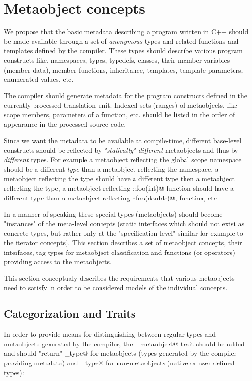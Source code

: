 \section{Metaobject concepts}

We propose that the basic metadata describing a program written
in C++ should be made available through a set of {\em anonymous} types
and related functions and templates
defined by the compiler. These types should describe various program
constructs like, namespaces, types, typedefs, classes, their member variables
(member data), member functions, inheritance, templates, template parameters,
enumerated values, etc.

The compiler should generate metadata for the program constructs defined
in the currently processed translation unit. Indexed sets (ranges) of metaobjects,
like scope members, parameters of a function, etc. should be listed
in the order of appearance in the processed source code.

Since we want the metadata to be available at compile-time,
different base-level constructs should be reflected by
{\em "statically" different} metaobjects and thus by {\em different} types.
For example a metaobject reflecting the global scope namespace should
be a different {\em type} than a metaobject reflecting the \verb@std@
namespace, a metaobject reflecting the \verb@int@ type should
have a different type then a metaobject reflecting the \verb@double@
type, a metaobject reflecting \verb@::foo(int)@ function should
have a different type than a metaobject reflecting \verb@::foo(double)@,
function, etc.

In a manner of speaking these special types (metaobjects) should become
"instances" of the meta-level concepts (static interfaces which
should not exist as concrete types, but rather only at the
"specification-level" similar for example to the iterator concepts).
This section describes a set of metaobject concepts,
their interfaces, tag types for metaobject classification and
functions (or operators) providing access to the metaobjects.

This section conceptualy describes the requirements that various metaobjects
need to satisfy in order to be considered models of the individual
concepts.

\subsection{Categorization and Traits}

In order to provide means for distinguishing between regular types
and metaobjects generated by the compiler,
the \verb@is_metaobject@ trait should be added
and should "return" \verb@true_type@ for metaobjects (types generated
by the compiler providing metadata) and \verb@false_type@
for non-metaobjects (native or user defined types):

